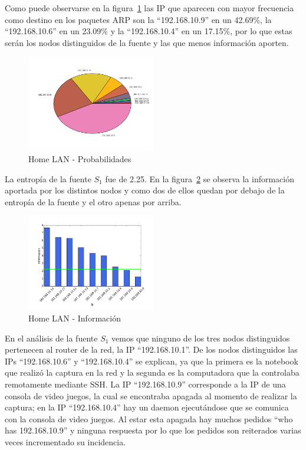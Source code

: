 \documentclass[final,inline,narroweqnarray,a4paper]{ieee}
\begin{document}
Como puede observarse en la figura~\ref{torta:homelanS1} las IP que aparecen con mayor frecuencia como destino en los paquetes ARP son la ``192.168.10.9'' en un 42.69\%, la ``192.168.10.6'' en un 23.09\% y la ``192.168.10.4'' en un 17.15\%, por lo que estas serán los nodos distinguidos de la fuente y las que menos información aporten.

\begin{figure}[H]
    \begin{center}
        \includegraphics[width=0.5\textwidth]{plot/homelanS1-pie.png}
        \caption{Home LAN - Probabilidades}
        \label{torta:homelanS1}
    \end{center}
\end{figure} 

La entropía de la fuente $S_1$ fue de 2.25. En la figura~\ref{histo:homelanS1} se observa la información aportada por los distintos nodos y como dos de ellos quedan por debajo de la entropía de la fuente y el otro apenas por arriba. 

\begin{figure}[H]
    \begin{center}
        \includegraphics[width=0.5\textwidth]{plot/homelanS1-bar.png}
        \caption{Home LAN - Información}
        \label{histo:homelanS1}
    \end{center}
\end{figure}

En el análisis de la fuente $S_1$ vemos que ninguno de los tres nodos distinguidos pertenecen al router de la red, la IP ``192.168.10.1''. De los nodos distinguidos las IPs ``192.168.10.6'' y ``192.168.10.4'' se explican, ya que la primera es la notebook que realizó la captura en la red y la segunda es la computadora que la controlaba remotamente mediante SSH. La IP ``192.168.10.9'' corresponde a la IP de una consola de video juegos, la cual se encontraba apagada al momento de realizar la captura; en la IP ``192.168.10.4'' hay un daemon ejecutándose que se comunica con la consola de video juegos. Al estar esta apagada hay muchos pedidos ``who has 192.168.10.9'' y ninguna respuesta por lo que los pedidos son reiterados varias veces incrementado su incidencia.
\end{document}
